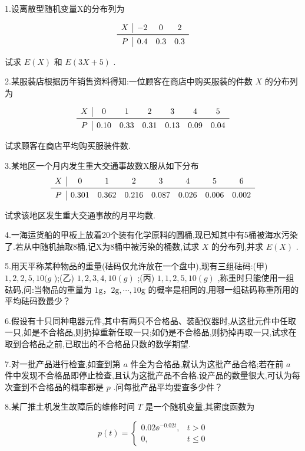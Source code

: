 1.设离散型随机变量X的分布列为

\[
\begin{array}{c|ccc}
X & {-2} & {0} & {2} \\ \midrule 
P & {0.4} & {0.3} & {0.3} \\ 
\end{array}
\]

试求 $ E(X) $ 和 $ E(3X+5) $ .

2.某服装店根据历年销售资料得知:一位顾客在商店中购买服装的件数 $ X $ 的分布列为

\[
\begin{array}{c|cccccc}
X & {0} & {1} & {2} & {3} & {4} & {5} \\ \midrule
P & {0.10} & {0.33} & {0.31} & {0.13} & {0.09} & {0.04}
\end{array}
\]

试求顾客在商店平均购买服装件数.

3.某地区一个月内发生重大交通事故数X服从如下分布
\[
\begin{array}{c|ccccccc}
X     & 0     & 1     & 2     & 3     & 4     & 5     & 6 \\\midrule
P     & 0.301 & 0.362 & 0.216 & 0.087 & 0.026 & 0.006 & 0.002 \\
\end{array}
\]


试求该地区发生重大交通事故的月平均数.

4.一海运货船的甲板上放着20个装有化学原料的圆桶,现已知其中有5桶被海水污染了.若从中随机抽取8桶,记X为8桶中被污染的桶数,试求 $ X $ 的分布列,并求 $ E(X) $ .

5.用天平称某种物品的重量(砝码仅允许放在一个盘中),现有三组砝码:(甲) $ 1,2,2,5,
10(g $ );(乙) $ 1,2,3,4,10(g) $ ;(丙) $ 1,1,2,5,10(g) $ ,称重时只能使用一组砝码,问:当物品的重量为 $ 1 \mathrm{g}， 2 \mathrm{g}, \cdots, 10 \mathrm{g} $ 的概率是相同的,用哪一组砝码称重所用的平均砝码数最少？

6.假设有十只同种电器元件,其中有两只不合格品、装配仪器时,从这批元件中任取一只,如是不合格品,则扔掉重新任取一只;如仍是不合格品,则扔掉再取一只,试求在取到合格品之前,已取出的不合格品只数的数学期望.

7.对一批产品进行检查,如查到第 $ a $ 件全为合格品,就认为这批产品合格;若在前 $ a $ 件中发现不合格品即停止检查,且认为这批产品不合格.设产品的数量很大,可认为每次查到不合格品的概率都是 $ p $ .问每批产品平均要查多少件？

8.某厂推土机发生故障后的维修时间 $ T $ 是一个随机变量,其密度函数为

\[
p(t)=\left\{\begin{array}{ll}
{0.02 \ee ^{-0.02 t},} & {t>0} \\ 
{0,} & {t \leqslant 0}
\end{array}\right.
\]

